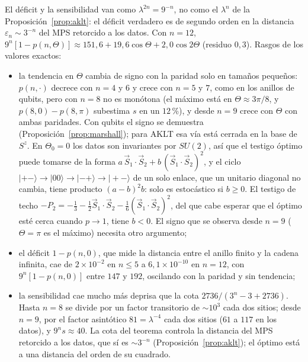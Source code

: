 \documentclass[11pt,a4paper]{article}
\theoremstyle{remark}
\newcommand{\ket}[1]{|#1\rangle}
\begin{document}
El déficit y la sensibilidad van como $\lambda^{2n}=9^{-n}$, no como el $\lambda^n$ de la
Proposición~\ref{prop:aklt}: el déficit verdadero es de segundo orden en la distancia
$\varepsilon_n\sim3^{-n}$ del MPS retorcido a los datos. Con $n=12$,
$9^n[1-p(n,\Theta)]\approx151{,}6+19{,}6\cos\Theta+2{,}0\cos2\Theta$ (residuo $0{,}3$). Rasgos de
los valores exactos:
\begin{itemize}
\item la tendencia en $\Theta$ cambia de signo con la paridad solo en tamaños pequeños:
  $p(n,\cdot)$ decrece con $n=4$ y $6$ y crece con $n=5$ y $7$, como en los anillos de qubits,
  pero con $n=8$ no es monótona (el máximo está en $\Theta\approx3\pi/8$, y $p(8,0)-p(8,\pi)$
  subestima $s$ en un $12$\,\%), y desde $n=9$ crece con $\Theta$ con ambas paridades. Con qubits
  el signo se demuestra (Proposición~\ref{prop:marshall}); para AKLT esa vía está cerrada en la
  base de $S^z$. En $\Theta_0=0$ los datos son invariantes por $SU(2)$, así que el testigo óptimo
  puede tomarse de la forma $a\,\vec S_1\cdot\vec S_2+b\,(\vec S_1\cdot\vec S_2)^2$, y el ciclo
  $\ket{{+}{-}}\to\ket{00}\to\ket{{-}{+}}\to\ket{{+}{-}}$ de un solo enlace, que un unitario
  diagonal no cambia, tiene producto $(a-b)^2b$: solo es estocástico si $b\ge0$. El testigo de
  techo $-P_2=-\tfrac13-\tfrac12\vec S_1\cdot\vec S_2-\tfrac16(\vec S_1\cdot\vec S_2)^2$, del que
  cabe esperar que el óptimo esté cerca cuando $p\to1$, tiene $b<0$. El signo que se observa
  desde $n=9$ ($\Theta=\pi$ es el máximo) necesita otro argumento;
\item el déficit $1-p(n,0)$, que mide la distancia entre el anillo finito y la cadena infinita, cae
  de $2\times10^{-2}$ en $n\le5$ a $6{,}1\times10^{-10}$ en $n=12$, con $9^n[1-p(n,0)]$ entre $147$ y $192$, oscilando con la
  paridad y sin tendencia;
\item la sensibilidad cae mucho más deprisa que la cota $2736/(3^n-3+2736)$. Hasta $n=8$ se divide por
  un factor transitorio de $\sim10^{3}$ cada dos sitios; desde $n=9$, por el factor asintótico
  $81=\lambda^{-4}$ cada dos sitios ($61$ a $117$ en los datos), y $9^ns\approx40$. La cota del
  teorema controla la distancia del MPS retorcido a los datos, que sí es $\sim3^{-n}$
  (Proposición~\ref{prop:aklt}); el óptimo está a una distancia del orden de su cuadrado.
\end{itemize}
\end{document}

